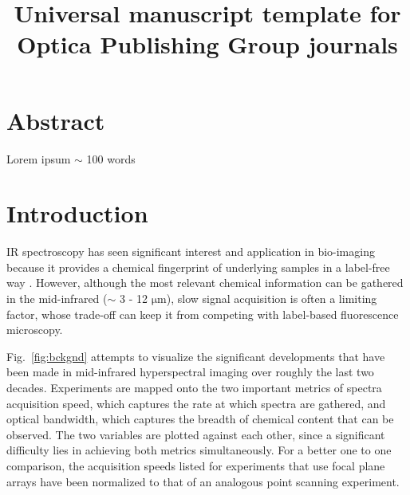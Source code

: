 \documentclass{optica-article}
\begin{document}
\title{Universal manuscript template for Optica Publishing Group journals}

\section{Abstract}
Lorem ipsum $\sim$ 100 words

\section{Introduction}
IR spectroscopy has seen significant interest and application in bio-imaging because it provides a chemical fingerprint of underlying samples in a label-free way \cite{baker_using_2014}. However, although the most relevant chemical information can be gathered in the mid-infrared ($\sim$ 3 - 12 $\mathrm{\mu m}$), slow signal acquisition is often a limiting factor, whose trade-off can keep it from competing with label-based fluorescence microscopy.

Fig.~\ref{fig:bckgnd} attempts to visualize the significant developments that have been made in mid-infrared hyperspectral imaging over roughly the last two decades. Experiments are mapped onto the two important metrics of spectra acquisition speed, which captures the rate at which spectra are gathered, and optical bandwidth, which captures the breadth of chemical content that can be observed. The two variables are plotted against each other, since a significant difficulty lies in achieving both metrics simultaneously. For a better one to one comparison, the acquisition speeds listed for experiments that use focal plane arrays have been normalized to that of an analogous point scanning experiment.

\end{document}
